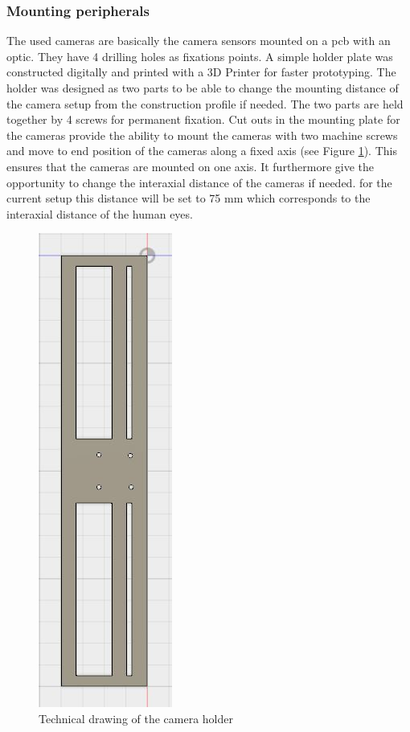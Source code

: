 \subsubsection{Mounting peripherals}
The used cameras are basically the camera sensors mounted on a pcb with an optic. They have 4 drilling holes as fixations points. A simple holder plate was constructed digitally and printed with a 3D Printer for faster prototyping. The holder was designed as two parts to be able to change the mounting distance of the camera setup from the construction profile if needed. The two parts are held together by 4 screws for permanent fixation. Cut outs in the mounting plate for the cameras provide the ability to mount the cameras with two machine screws and move to end position of the cameras along a fixed axis (see Figure \ref{img:camera_holder}). This ensures that the cameras are mounted on one axis. It furthermore give the opportunity to change the interaxial distance of the cameras if needed. for the current setup this distance will be set to 75 mm which corresponds to the interaxial distance of the human eyes.
\begin{figure}[H]
\includegraphics[height=\textwidth, angle=90]{images/CAmera_holder_2.JPG}
\caption{Technical drawing of the camera holder}
\label{img:camera_holder} 
\end{figure}
